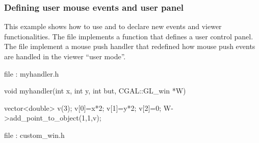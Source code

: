 \subsubsection{Defining user mouse events and user panel}

This example shows how to use  and
 to declare new events and viewer
functionalities. The file  implements a function
 that defines a user control
panel. The file  implement a mouse push handler that
redefined how mouse push events are handled in the viewer ``user mode''.

file : myhandler.h
\begin{cprog} 
void myhandler(int x, int y, int but, CGAL::GL_win *W) {
  vector<double> v(3);
  v[0]=x*2; v[1]=y*2; v[2]=0;
  W->add_point_to_object(1,1,v);

}
\end{cprog}

file : custom\_win.h

